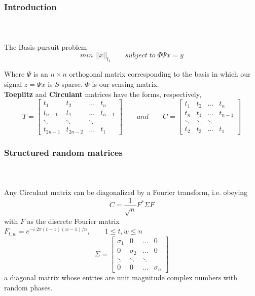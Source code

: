 
\begin{frame}[t]
	\frametitle{Introduction}
	\framesubtitle{~~}  %

	The Basis pursuit problem 
	\begin{equation}
		min  \;||x||_{l_1} \qquad   subject \; to \; \Phi \Psi x=y
	\end{equation}

	\small
	Where $\Psi$ is an $n \times n$ orthogonal matrix corresponding to the basis in which our signal $z = \Psi x$ is $S$-sparse. $\Phi$ is our sensing matrix. 
	\\
	\normalfont
	\textbf{Toeplitz} and \textbf{Circulant} matrices have the forms, respectively,
	\\
	
	$$
	T = \begin{bmatrix}
		t_{1}    & t_{2}    & ...    & t_{n}   \\[0.3em]
		t_{n+1}  & t_{1}    & ...    & t_{n-1} \\[0.3em]
		\ddots   & \ddots   & \ddots &         \\[0.3em]
		t_{2n-1} & t_{2n-2} & ...    & t_{1}         
	\end{bmatrix}
	\qquad and \qquad
	C = \begin{bmatrix}
		t_{1}  & t_{2}  & ...    & t_{n}   \\[0.3em]
		t_{n}  & t_{1}  & ...    & t_{n-1} \\[0.3em]
		\ddots & \ddots & \ddots &         \\[0.3em]
		t_{2}  & t_{3}  & ...    & t_{1}        
	\end{bmatrix} 
	$$
\end{frame}
\begin{frame}[t]
	\frametitle{Structured random matrices}
	\framesubtitle{~~}  %
	Any Circulant matrix can be diagonalized by a Fourier transform, i.e. obeying
	$$ C=\frac{1}{\sqrt{n}} F^* \Sigma F $$ with $F$ as the discrete Fourier matrix
	$F_{t,w}=e^{-i\; 2\pi(t-1)(w-1)/n}, \qquad 1 \le t,w \le n$
	$$
	\Sigma = \begin{bmatrix}
		\sigma_{1} & 0 & ...& 0           \\[0.3em]
		0 & \sigma_{2} & ... & 0 \\[0.3em]
		\ddots &\ddots & \ddots &      \\[0.3em]
		0 & 0 & ... & \sigma_{n}        
	\end{bmatrix} $$
	a diagonal matrix whose entries are unit magnitude complex numbers with random phases.
\end{frame}


